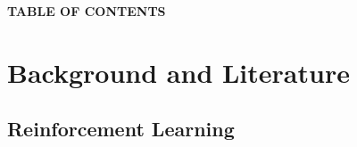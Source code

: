 \documentclass[twoside,letterpaper]{article}
\begin{document}
{\bfseries\color{black}
TABLE OF CONTENTS
\par}


\setcounter{tocdepth}{9}
\renewcommand\contentsname{}
\tableofcontents

\flushleft
\clearpage\clearpage\setcounter{page}{1}
\section[Background and Literature]
{\rmfamily\bfseries\color{black}
Background and Literature}

\subsection[Reinforcement Learning]{\rmfamily\bfseries\color{black}
Reinforcement Learning}
\end{document}
